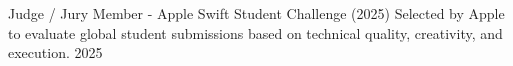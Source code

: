 \begin{cvhonors}
  \cvhonor
    {Judge / Jury Member - Apple Swift Student Challenge (2025)}
    {Selected by Apple to evaluate global student submissions based on technical quality, creativity, and execution.}
    {}
    {2025}
\end{cvhonors}
